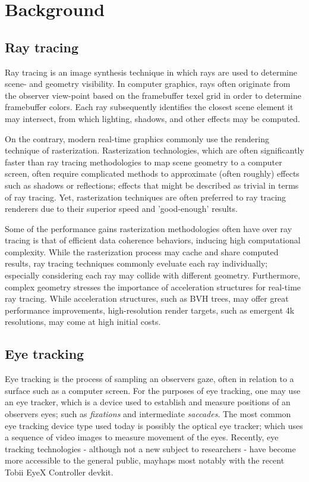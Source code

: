 \section{Background}
\subsection{Ray tracing}
Ray tracing is an image synthesis technique in which rays are used to determine scene- and geometry visibility.
In computer graphics, rays often originate from the observer view-point based on the framebuffer texel grid in order to determine framebuffer colors.
Each ray subsequently identifies the closest scene element it may intersect, from which lighting, shadows, and other effects may be computed.

On the contrary, modern real-time graphics commonly use the rendering technique of rasterization.
Rasterization technologies, which are often significantly faster than ray tracing methodologies to map scene geometry to a computer screen, often require complicated methods to approximate (often roughly) effects such as shadows or reflections; effects that might be described as trivial in terms of ray tracing.
Yet, rasterization techniques are often preferred to ray tracing renderers due to their superior speed and 'good-enough' results.

Some of the performance gains rasterization methodologies often have over ray tracing is that of efficient data coherence behaviors, inducing high computational complexity.
While the rasterization process may cache and share computed results, ray tracing techniques commonly eveluate each ray individually; especially considering each ray may collide with different geometry.
Furthermore, complex geometry stresses the importance of acceleration structures for real-time ray tracing.
While acceleration structures, such as BVH trees, may offer great performance improvements, high-resolution render targets, such as emergent 4k resolutions, may come at high initial costs.

\subsection{Eye tracking}
Eye tracking is the process of sampling an observers gaze, often in relation to a surface such as a computer screen.
For the purposes of eye tracking, one may use an eye tracker, which is a device used to establish and measure positions of an observers eyes\cite{duchowski07}; such as \textit{fixations} and intermediate \textit{saccades}\cite{rayner98}.
The most common eye tracking device type used today is possibly the optical eye tracker; which uses a sequence of video images to measure movement of the eyes\cite{duchowski07}.
Recently, eye tracking technologies - although not a new subject to researchers - have become more accessible to the general public, mayhaps most notably with the recent Tobii EyeX Controller devkit.

